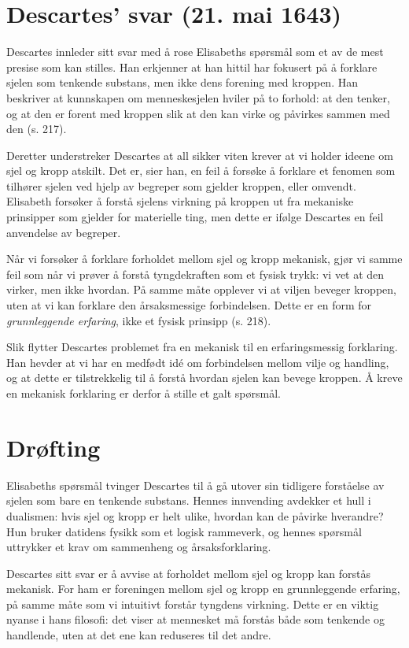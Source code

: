\documentclass[12pt, a4paper]{article}
\begin{document}
\section{Descartes’ svar (21. mai 1643)}

Descartes innleder sitt svar med å rose Elisabeths spørsmål som et av de mest presise som kan stilles. Han erkjenner at han hittil har fokusert på å forklare sjelen som tenkende substans, men ikke dens forening med kroppen. Han beskriver at kunnskapen om menneskesjelen hviler på to forhold: at den tenker, og at den er forent med kroppen slik at den kan virke og påvirkes sammen med den (s. 217).

Deretter understreker Descartes at all sikker viten krever at vi holder ideene om sjel og kropp atskilt. Det er, sier han, en feil å forsøke å forklare et fenomen som tilhører sjelen ved hjelp av begreper som gjelder kroppen, eller omvendt. Elisabeth forsøker å forstå sjelens virkning på kroppen ut fra mekaniske prinsipper som gjelder for materielle ting, men dette er ifølge Descartes en feil anvendelse av begreper. 

Når vi forsøker å forklare forholdet mellom sjel og kropp mekanisk, gjør vi samme feil som når vi prøver å forstå tyngdekraften som et fysisk trykk: vi vet at den virker, men ikke hvordan. På samme måte opplever vi at viljen beveger kroppen, uten at vi kan forklare den årsaksmessige forbindelsen. Dette er en form for \textit{grunnleggende erfaring}, ikke et fysisk prinsipp (s. 218).

Slik flytter Descartes problemet fra en mekanisk til en erfaringsmessig forklaring. Han hevder at vi har en medfødt idé om forbindelsen mellom vilje og handling, og at dette er tilstrekkelig til å forstå hvordan sjelen kan bevege kroppen. Å kreve en mekanisk forklaring er derfor å stille et galt spørsmål.

\section{Drøfting}

Elisabeths spørsmål tvinger Descartes til å gå utover sin tidligere forståelse av sjelen som bare en tenkende substans. Hennes innvending avdekker et hull i dualismen: hvis sjel og kropp er helt ulike, hvordan kan de påvirke hverandre? Hun bruker datidens fysikk som et logisk rammeverk, og hennes spørsmål uttrykker et krav om sammenheng og årsaksforklaring.

Descartes sitt svar er å avvise at forholdet mellom sjel og kropp kan forstås mekanisk. For ham er foreningen mellom sjel og kropp en grunnleggende erfaring, på samme måte som vi intuitivt forstår tyngdens virkning. Dette er en viktig nyanse i hans filosofi: det viser at mennesket må forstås både som tenkende og handlende, uten at det ene kan reduseres til det andre.
\end{document}
